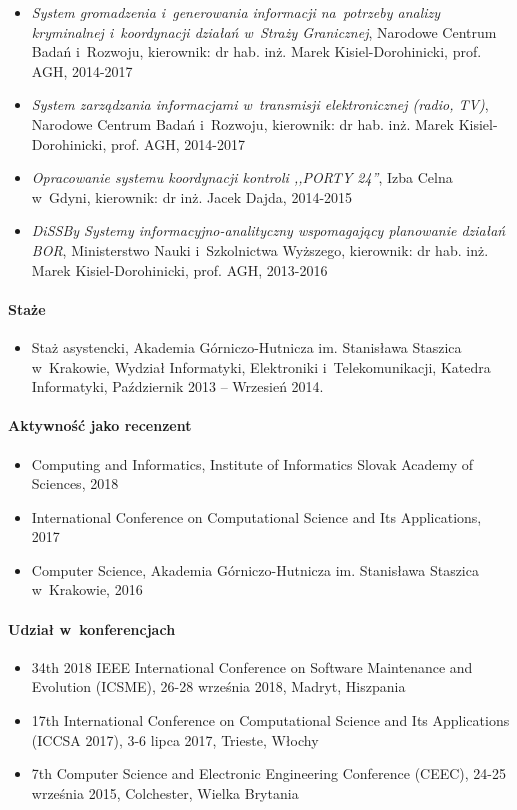 \documentclass[twoside]{praca}
\begin{document}
\begin{itemize}
\item \textit{System gromadzenia i~generowania informacji na~potrzeby analizy kryminalnej i~koordynacji działań w~Straży Granicznej}, Narodowe Centrum Badań i~Rozwoju, kierownik: dr hab. inż. Marek Kisiel-Dorohinicki, prof. AGH, 2014-2017

\item \textit{System zarządzania informacjami w~transmisji elektronicznej (radio, TV)}, Narodowe Centrum Badań i~Rozwoju, kierownik: dr hab. inż. Marek Kisiel-Do\-ro\-hi\-ni\-cki, prof. AGH, 2014-2017

\item \textit{Opracowanie systemu koordynacji kontroli ,,PORTY 24''}, Izba Celna w~Gdyni, kierownik: dr inż. Jacek Dajda, 2014-2015

\item \textit{DiSSBy Systemy informacyjno-analityczny wspomagający planowanie działań BOR}, Ministerstwo Nauki i~Szkolnictwa Wyższego, kierownik: dr hab. inż. Marek Kisiel-Dorohinicki, prof. AGH, 2013-2016

\end{itemize}

\paragraph{Staże}
\begin{itemize}
\item Staż asystencki, Akademia Górniczo-Hutnicza im. Stanisława Staszica w~Krakowie, Wydział Informatyki, Elektroniki i~Telekomunikacji, Katedra Informatyki, Październik 2013 -- Wrzesień 2014.
\end{itemize}


\paragraph{Aktywność jako recenzent}
\begin{itemize}
\item Computing and Informatics, Institute of Informatics Slovak Academy of Sciences, 2018
\item International Conference on Computational Science and Its Applications, 2017
\item Computer Science, Akademia Górniczo-Hutnicza im. Stanisława Staszica w~Krakowie, 2016
\end{itemize}


\paragraph{Udział w~konferencjach}
\begin{itemize}
\item 34th 2018 IEEE International Conference on Software Maintenance and Evolution (ICSME), 26-28 września 2018, Madryt, Hiszpania
\item 17th International Conference on Computational Science and Its Applications (ICCSA 2017), 3-6 lipca 2017, Trieste, Włochy
\item 7th Computer Science and Electronic Engineering Conference (CEEC), 24-25 września 2015, Colchester, Wielka Brytania
\end{itemize}
\end{document}
